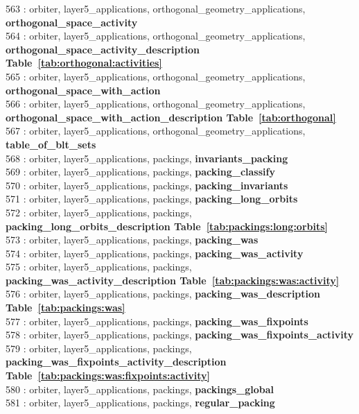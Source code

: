 563 : orbiter, layer5\_applications, orthogonal\_geometry\_applications, {\bf orthogonal\_space\_activity}\\
564 : orbiter, layer5\_applications, orthogonal\_geometry\_applications, {\bf orthogonal\_space\_activity\_description Table~\ref{tab:orthogonal:activities}}\\
565 : orbiter, layer5\_applications, orthogonal\_geometry\_applications, {\bf orthogonal\_space\_with\_action}\\
566 : orbiter, layer5\_applications, orthogonal\_geometry\_applications, {\bf orthogonal\_space\_with\_action\_description Table~\ref{tab:orthogonal}}\\
567 : orbiter, layer5\_applications, orthogonal\_geometry\_applications, {\bf table\_of\_blt\_sets}\\
568 : orbiter, layer5\_applications, packings, {\bf invariants\_packing}\\
569 : orbiter, layer5\_applications, packings, {\bf packing\_classify}\\
570 : orbiter, layer5\_applications, packings, {\bf packing\_invariants}\\
571 : orbiter, layer5\_applications, packings, {\bf packing\_long\_orbits}\\
572 : orbiter, layer5\_applications, packings, {\bf packing\_long\_orbits\_description Table~\ref{tab:packings:long:orbits}}\\
573 : orbiter, layer5\_applications, packings, {\bf packing\_was}\\
574 : orbiter, layer5\_applications, packings, {\bf packing\_was\_activity}\\
575 : orbiter, layer5\_applications, packings, {\bf packing\_was\_activity\_description Table~\ref{tab:packings:was:activity}}\\
576 : orbiter, layer5\_applications, packings, {\bf packing\_was\_description Table~\ref{tab:packings:was}}\\
577 : orbiter, layer5\_applications, packings, {\bf packing\_was\_fixpoints}\\
578 : orbiter, layer5\_applications, packings, {\bf packing\_was\_fixpoints\_activity}\\
579 : orbiter, layer5\_applications, packings, {\bf packing\_was\_fixpoints\_activity\_description Table~\ref{tab:packings:was:fixpoints:activity}}\\
580 : orbiter, layer5\_applications, packings, {\bf packings\_global}\\
581 : orbiter, layer5\_applications, packings, {\bf regular\_packing}\\
